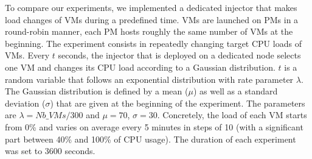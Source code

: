 To compare our experiments, we implemented a dedicated injector that makes load changes of
VMs during a predefined time. VMs are launched on PMs in a round-robin manner, \ie each
PM hosts roughly the same number of VMs at the beginning. The experiment consists in
repeatedly changing target CPU loads of VMs. Every $t$ seconds, the injector that is
deployed on a dedicated node selects one VM and changes its CPU load according to a
Gaussian distribution. $t$ is a random variable that follows an exponential distribution
with rate parameter $\lambda$. The Gaussian distribution is defined by a mean ($\mu$) as
well as a standard deviation ($\sigma$) that are given at the beginning of the experiment.
The parameters are $\lambda=\mathit{Nb\_VMs}/300$ and $\mu=70$, $\sigma=30$.
Concretely, the load of each VM starts from 0\% and varies on average every 5
minutes in steps of 10 (with a significant part between 40\% and 100\% of CPU
usage). The duration of each experiment was set to 3600 seconds.

